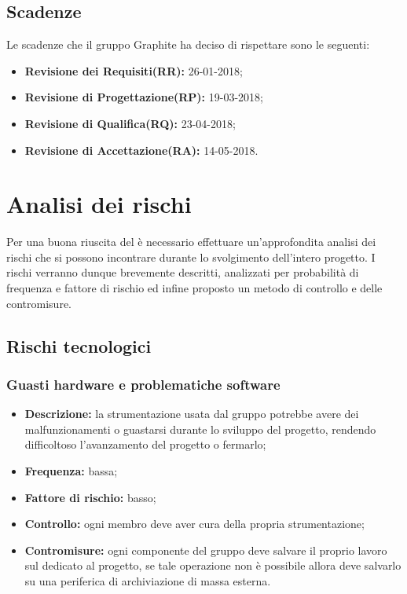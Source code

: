 \documentclass[../PianodiProgetto.tex]{subfiles}
\begin{document}
	\section{Scadenze}
	Le scadenze che il gruppo Graphite ha deciso di rispettare sono le seguenti:
	\begin{itemize}
		\item \textbf{Revisione dei Requisiti(RR):} 26-01-2018;
		\item \textbf{Revisione di Progettazione(RP):} 19-03-2018;
		\item \textbf{Revisione di Qualifica(RQ):} 23-04-2018;
		\item \textbf{Revisione di Accettazione(RA):} 14-05-2018.
	\end{itemize}
	
	\chapter{Analisi dei rischi}
	Per una buona riuscita del  è necessario effettuare un'approfondita analisi dei rischi che si possono incontrare durante lo svolgimento dell'intero progetto. I rischi verranno dunque brevemente descritti, analizzati per probabilità di frequenza e fattore di rischio ed infine proposto un metodo di controllo e delle contromisure.
	
	\section{Rischi tecnologici}
	\subsection{Guasti hardware e problematiche software}
	\begin{itemize}
		\item \textbf{Descrizione:} la strumentazione usata dal gruppo potrebbe avere dei malfunzionamenti o guastarsi durante lo sviluppo del progetto, rendendo difficoltoso l'avanzamento del progetto o fermarlo;
		\item \textbf{Frequenza:} bassa;
		\item \textbf{Fattore di rischio:} basso;
		\item \textbf{Controllo:} ogni membro deve aver cura della propria strumentazione;
		\item \textbf{Contromisure:} ogni componente del gruppo deve salvare il proprio lavoro sul   dedicato al progetto, se tale operazione non è possibile allora deve salvarlo su una periferica di archiviazione di massa esterna.
	\end{itemize}
	
\end{document}

